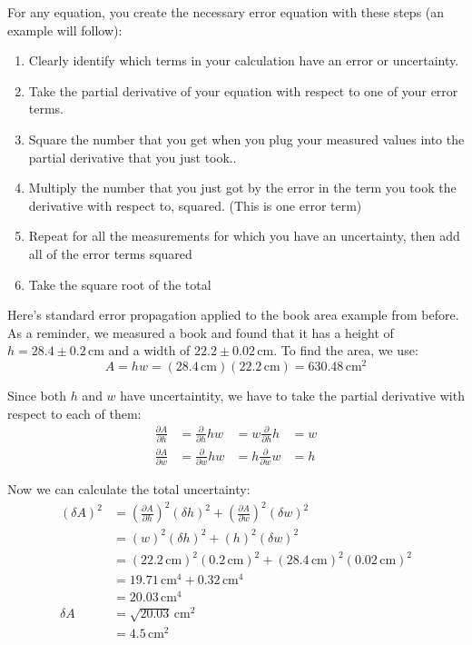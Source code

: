 \documentclass[twoside,11pt,ShortChapTitles]{BYUTextbook}
\begin{document}
 For any equation, you create the necessary error equation with these steps (an example will follow):
 \begin{enumerate}
 \item Clearly identify which terms in your calculation have an error or uncertainty.
 \item Take the partial derivative of your equation with respect to one of your error terms.
 \item Square the number that you get when you plug your measured values into the partial derivative that you just took..
 \item Multiply the number that you just got by the error in the term you took the derivative with respect to, squared.  (This is one error term)
 \item Repeat for all the measurements for which you have an uncertainty, then add all of the error terms squared
 \item Take the square root of the total
 \end{enumerate}

 Here's standard error propagation applied to the book area example from before. As a reminder, we measured a  book and found that it has a height of $h=28.4\pm0.2\,\text{cm} $ and a width of $22.2 \pm0.02\,\text{cm}$.  To find the area, we use:
\[A = hw= (28.4\,\text{cm})(22.2\,\text{cm}) = 630.48\,\text{cm}^2\]

Since both $h$ and $w$ have uncertaintity, we have to take the partial derivative with respect to each of them:
\[\begin{aligned}
\frac{\partial A}{\partial h} &= \frac{\partial}{\partial h} hw&= w\frac{\partial}{\partial h} h &= w\\
\frac{\partial A}{\partial w} &= \frac{\partial}{\partial w} hw&= h\frac{\partial}{\partial w} w &= h
\end{aligned}\]

Now we can calculate the total uncertainty:
\begin{align*}
\left(\delta A\right)^2&=\left(\frac{\partial A}{\partial h}\right)^2\left(\delta h\right)^2+\left(\frac{\partial A}{\partial w}\right)^2\left(\delta w\right)^2\\
&=\left(w\right)^2\left(\delta h\right)^2+\left(h\right)^2\left(\delta w\right)^2\\
&=\left(22.2\,\text{cm}\right)^2\left(0.2\,\text{cm}\right)^2+\left(28.4\,\text{cm}\right)^2\left(0.02\,\text{cm}\right)^2\\
&=19.71\,\text{cm}^4+0.32\,\text{cm}^4\\
&=20.03\,\text{cm}^4\\
\delta A &=\sqrt{20.03}\,\text{cm}^2\\
&=4.5 \,\text{cm}^2
\end{align*}
\end{document}
